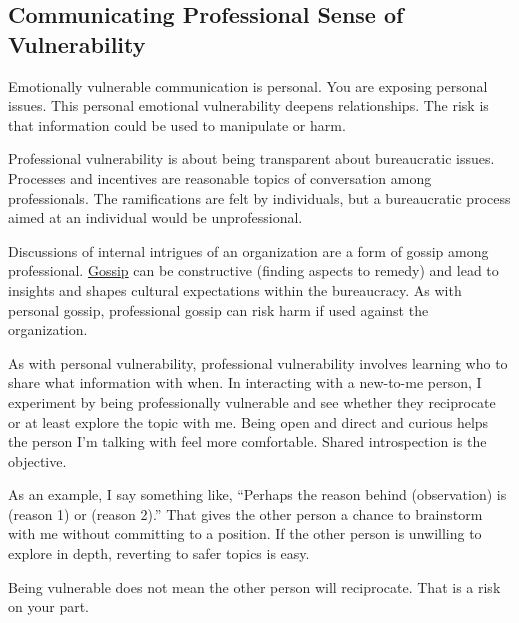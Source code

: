 \subsection{Communicating Professional Sense of Vulnerability}

Emotionally vulnerable communication is personal. You are exposing personal issues. This personal emotional vulnerability deepens relationships. The risk is that information could be used to manipulate or harm. 

Professional vulnerability is about being transparent about bureaucratic issues. Processes and incentives are reasonable topics of conversation among professionals. The ramifications are felt by individuals, but a bureaucratic process aimed at an individual would be unprofessional. 

Discussions of internal intrigues of an organization are a form of gossip among professional. \href{https://en.wikipedia.org/wiki/Gossip}{Gossip} can be constructive (finding aspects to remedy) and lead to insights and shapes cultural expectations within the bureaucracy. As with personal gossip, professional gossip can risk harm if used against the organization. 

As with personal vulnerability, professional vulnerability involves learning who to share what information with when. In interacting with a new-to-me person, I experiment by being professionally vulnerable and see whether they reciprocate or at least explore the topic with me. Being open and direct and curious helps the person I'm talking with feel more comfortable. Shared introspection is the objective. 

As an example, I say something like, ``Perhaps the reason behind (observation) is (reason 1) or (reason 2).'' That gives the other person a chance to brainstorm with me without committing to a position. If the other person is unwilling to explore in depth, reverting to safer topics is easy.

Being vulnerable does not mean the other person will reciprocate. That is a risk on your part. 